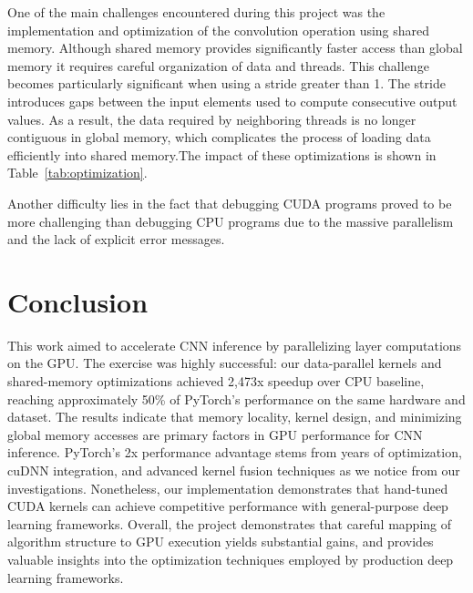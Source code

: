 \documentclass[11pt]{article}
\begin{document}
One of the main challenges encountered during this project was the implementation and optimization of the convolution operation using shared memory. Although shared memory provides significantly faster access than global memory it requires careful organization of data and threads.
This challenge becomes particularly significant when using a stride greater than 1. The stride introduces gaps between the input elements used to compute consecutive output values. As a result, the data required by neighboring threads is no longer contiguous in global memory, which complicates the process of loading data efficiently into shared memory.The impact of these optimizations is shown in Table~\ref{tab:optimization}.

Another difficulty lies in the fact that debugging CUDA programs proved to be more challenging than debugging CPU programs due to the massive parallelism and the lack of explicit error messages.

\section{Conclusion}
This work aimed to accelerate CNN inference by parallelizing layer computations on the GPU. The exercise was highly successful: our data-parallel kernels and shared-memory optimizations achieved 2,473x speedup over CPU baseline, reaching approximately 50\% of PyTorch's performance on the same hardware and dataset. The results indicate that memory locality, kernel design, and minimizing global memory accesses are primary factors in GPU performance for CNN inference. PyTorch's 2x performance advantage stems from years of optimization, cuDNN integration, and advanced kernel fusion techniques as we notice from our investigations. Nonetheless, our implementation demonstrates that hand-tuned CUDA kernels can achieve competitive performance with general-purpose deep learning frameworks. Overall, the project demonstrates that careful mapping of algorithm structure to GPU execution yields substantial gains, and provides valuable insights into the optimization techniques employed by production deep learning frameworks.




\newpage
\end{document}
